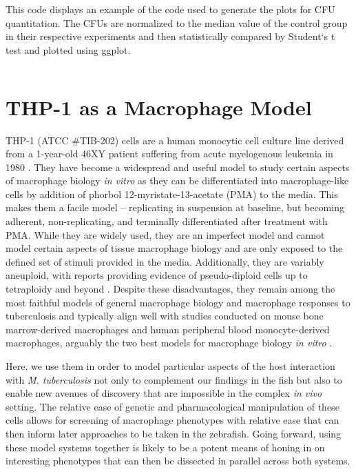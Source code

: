 \begin{code}
\caption{This code displays an example of the code used to generate the plots for CFU quantitation. The CFUs are normalized to the median value of the control group in their respective experiments and then statistically compared by Student`s t test and plotted using ggplot.}
\label{cfuanalysis}

\inputminted[breaklines,frame=single,fontsize=\small]{r}{source/cfu_plot_example.R}

\end{code}

\section{THP\hyp{}1 as a Macrophage Model}\label{thp1}

THP\hyp{}1 (ATCC \#TIB\hyp{}202) cells are a human monocytic cell culture line derived from a 1\hyp{}year\hyp{}old 46XY patient suffering from acute myelogenous leukemia in 1980 \citep{Tsuchiya1980}. They have become a widespread and useful model to study certain aspects of macrophage biology \textit{in vitro} as they can be differentiated into macrophage\hyp{}like cells by addition of phorbol 12\hyp{}myristate\hyp{}13\hyp{}acetate (PMA) to the media. This makes them a facile model -- replicating in suspension at baseline, but becoming adherent, non\hyp{}replicating, and terminally differentiated after treatment with PMA. While they are widely used, they are an imperfect model and cannot model certain aspects of tissue macrophage biology and are only exposed to the defined set of stimuli provided in the media. Additionally, they are variably aneuploid, with reports providing evidence of pseudo\hyp{}diploid cells up to tetraploidy and beyond \citep{Odero2000, Adati2009, Kasai2022}. Despite these disadvantages, they remain among the most faithful models of general macrophage biology and macrophage responses to tuberculosis and typically align well with studies conducted on mouse bone marrow\hyp{}derived macrophages and human peripheral blood monocyte\hyp{}derived macrophages, arguably the two best models for macrophage biology \textit{in vitro} \citep{MendozaCoronel2016}. 

Here, we use them in order to model particular aspects of the host interaction with \textit{M. tuberculosis} not only to complement our findings in the fish but also to enable new avenues of discovery that are impossible in the complex \textit{in vivo} setting. The relative ease of genetic and pharmacological manipulation of these cells allows for screening of macrophage phenotypes with relative ease that can then inform later approaches to be taken in the zebrafish. Going forward, using these model systems together is likely to be a potent means of honing in on interesting phenotypes that can then be dissected in parallel across both systems. 

